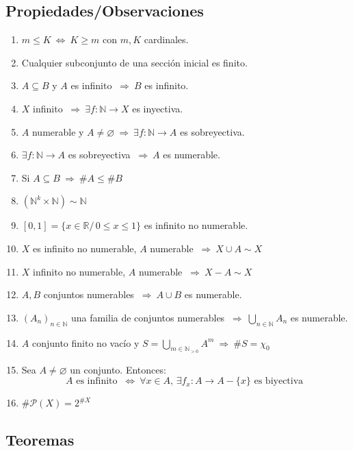 \documentclass{article}
\newcommand{\comma}{,\,}                                %
\newcommand{\tq}{/\,}                                   %
\newcommand{\naturales}{\mathbb{N}}                     %
\newcommand{\reales}{\mathbb{R}}                        %
\newcommand{\partes}{\mathcal{P}}
\newcommand{\Rightarrows}{\: \Rightarrow \:}            %
\newcommand{\Leftrightarrows}{\: \Leftrightarrow \:}    %
\begin{document}
\subsection{Propiedades/Observaciones}
\begin{enumerate}
    \item $m \leq K \Leftrightarrows K \geq m$ con $m, K$ cardinales.
    \item Cualquier subconjunto de una sección inicial es finito.
    \item $A \subseteq B$ y $A$ es infinito $\Rightarrows B$ es infinito.
    \item $X$ infinito $\Rightarrows \exists f: \naturales \rightarrow X$ es inyectiva.
    \item $A$ numerable y $A \neq \varnothing \Rightarrows \exists f: \naturales \rightarrow A$ es sobreyectiva.
    \item $\exists f: \naturales \rightarrow A$ es sobreyectiva $\Rightarrows A$ es numerable.
    \item Si $A \subseteq B \Rightarrows \#A \leq \#B$
    \item $(\naturales^k \times \naturales) \sim \naturales$
    \item $[0,1] = \{x \in \reales \tq 0 \leq x \leq 1 \}$ es infinito no numerable. 
    \item $X$ es infinito no numerable, $A$ numerable $\Rightarrows X \cup A \sim X$
    \item $X$ infinito no numerable, $A$ numerable $\Rightarrows X - A \sim X$
    \item $A,B$ conjuntos numerables $\Rightarrows A \cup B$ es numerable.
    \item $(A_n)_{n \in \naturales}$ una familia de conjuntos numerables $\Rightarrows \bigcup_{n \in \naturales} A_n$ es numerable.
    \item $A$ conjunto finito no vacío y $S = \bigcup_{m \in \naturales_{>0}} A^m \Rightarrows \#S = \chi_0$
    \item Sea $A \neq \varnothing$ un conjunto. Entonces:
    \begin{equation*}
        A \text{ es infinito } \Leftrightarrows \forall x \in A \comma \exists f_x: A \rightarrow A - \{x\} 
        \text{ es biyectiva }
    \end{equation*}
    
    \item $\#\partes(X) = 2^{\#X}$
\end{enumerate}

\subsection{Teoremas}
\end{document}
